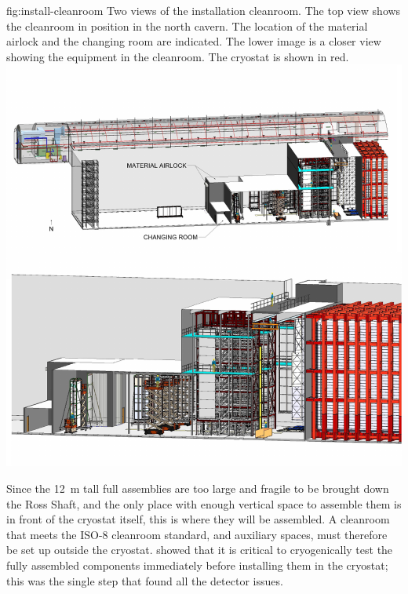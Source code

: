 \begin{dunefigure}{fig:install-cleanroom}
  {Two views of the installation cleanroom.  The top view shows the cleanroom in position in the north cavern. The location of the material airlock and the changing room are indicated. The lower image is a closer view showing the equipment in the cleanroom. The cryostat is shown in red.
  } 
\includegraphics[width=1.0\textwidth]{graphics/install-cleanroom.pdf}
\end{dunefigure}

Since the \SI{12}{m} tall full assemblies are too large and fragile to be brought down the Ross Shaft, and the only place with enough vertical space to assemble them is in front of the cryostat itself, this is where they will be assembled. A cleanroom that meets the ISO-8 cleanroom standard, and auxiliary spaces, must therefore be set up outside the cryostat.  
%
 showed that it is critical to cryogenically test the fully assembled components immediately before installing them in the cryostat; this was the single step that found all the detector issues. 

